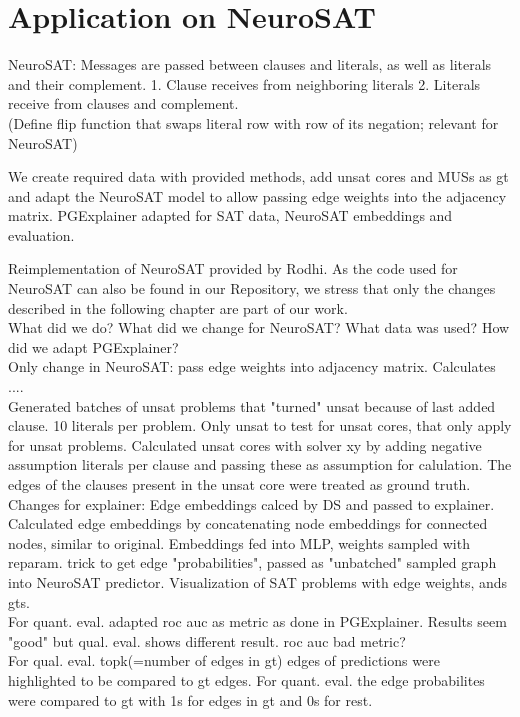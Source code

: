 \section{Application on NeuroSAT}
NeuroSAT: Messages are passed between clauses and literals, as well as literals and their complement. 1. Clause receives from neighboring literals 2. Literals receive from clauses and complement. \\
(Define flip function that swaps literal row with row of its negation; relevant for NeuroSAT)

We create required data with provided methods, add unsat cores and MUSs as gt and adapt the NeuroSAT model to allow passing edge weights into the adjacency matrix. PGExplainer adapted for SAT data, NeuroSAT embeddings and evaluation.


Reimplementation of NeuroSAT provided by Rodhi. As the code used for NeuroSAT can also be found in our Repository, we stress that only the changes described in the following chapter are part of our work. \\

What did we do? What did we change for NeuroSAT? What data was used? How did we adapt PGExplainer? \\

Only change in NeuroSAT: pass edge weights into adjacency matrix. Calculates .... \\
Generated batches of unsat problems that "turned" unsat because of last added clause. 10 literals per problem. Only unsat to test for unsat cores, that only apply for unsat problems. Calculated unsat cores with solver xy by adding negative assumption literals per clause and passing these as assumption for calulation. The edges of the clauses present in the unsat core were treated as ground truth. \\

Changes for explainer:
Edge embeddings calced by DS and passed to explainer. Calculated edge embeddings by concatenating node embeddings for connected nodes, similar to original. Embeddings fed into MLP, weights sampled with reparam. trick to get edge "probabilities", passed as "unbatched" sampled graph into NeuroSAT predictor. Visualization of SAT problems with edge weights, ands gts. \\
For quant. eval. adapted roc auc as metric as done in PGExplainer. Results seem "good" but qual. eval. shows different result. roc auc bad metric? \\
For qual. eval. topk(=number of edges in gt) edges of predictions were highlighted to be compared to gt edges. For quant. eval. the edge probabilites were compared to gt with 1s for edges in gt and 0s for rest. \\


